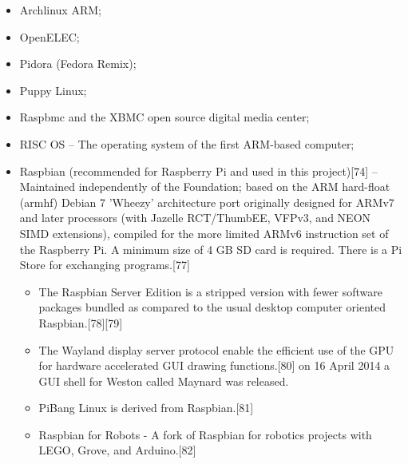 \documentclass{acm_proc_article-sp}
\begin{document}
\begin{itemize}

\item Archlinux ARM;
\item OpenELEC;
\item Pidora (Fedora Remix);
\item Puppy Linux;
\item Raspbmc and the XBMC open source digital media center;
\item RISC OS – The operating system of the first ARM-based computer;
\item Raspbian (recommended for Raspberry Pi and used in this project)[74] – Maintained independently of the Foundation; based on the ARM hard-float (armhf) Debian 7 'Wheezy' architecture port originally designed for ARMv7 and later processors (with Jazelle RCT/ThumbEE, VFPv3, and NEON SIMD extensions), compiled for the more limited ARMv6 instruction set of the Raspberry Pi. A minimum size of 4 GB SD card is required. There is a Pi Store for exchanging programs.[77]
\begin{itemize}
\item The Raspbian Server Edition is a stripped version with fewer software packages bundled as compared to the usual desktop computer oriented Raspbian.[78][79]
\item The Wayland display server protocol enable the efficient use of the GPU for hardware accelerated GUI drawing functions.[80] on 16 April 2014 a GUI shell for Weston called Maynard was released.
\item PiBang Linux is derived from Raspbian.[81]
\item Raspbian for Robots - A fork of Raspbian for robotics projects with LEGO, Grove, and Arduino.[82]
\end{itemize}
\end{itemize}
\end{document}
